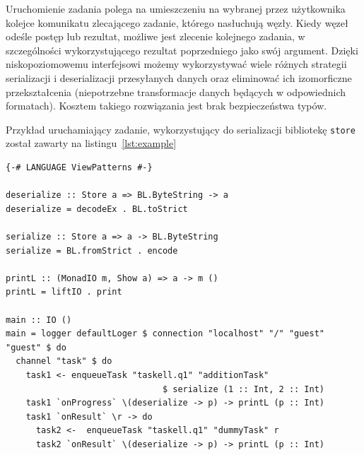Uruchomienie zadania polega na umieszczeniu na wybranej przez użytkownika kolejce komunikatu zlecającego zadanie, którego nasłuchują węzły. Kiedy węzeł odeśle postęp lub rezultat, możliwe jest zlecenie kolejnego zadania, w szczególności wykorzystującego rezultat poprzedniego jako swój argument. Dzięki niskopoziomowemu interfejsowi możemy wykorzystywać wiele różnych strategii serializacji i deserializacji przesyłanych danych oraz eliminować ich izomorficzne przekształcenia (niepotrzebne transformacje danych będących w odpowiednich formatach). Kosztem takiego rozwiązania jest brak bezpieczeństwa typów.

Przykład uruchamiający zadanie, wykorzystujący do serializacji bibliotekę \texttt{store} został zawarty na listingu~\ref{lst:example}
\newpage
\begin{lstlisting}[caption=Uruchamianie zadania, label=lst:example]
{-# LANGUAGE ViewPatterns #-}

deserialize :: Store a => BL.ByteString -> a
deserialize = decodeEx . BL.toStrict

serialize :: Store a => a -> BL.ByteString
serialize = BL.fromStrict . encode

printL :: (MonadIO m, Show a) => a -> m ()
printL = liftIO . print

main :: IO ()
main = logger defaultLoger $ connection "localhost" "/" "guest" "guest" $ do
  channel "task" $ do
    task1 <- enqueueTask "taskell.q1" "additionTask" 
                               $ serialize (1 :: Int, 2 :: Int)
    task1 `onProgress` \(deserialize -> p) -> printL (p :: Int)
    task1 `onResult` \r -> do
      task2 <-  enqueueTask "taskell.q1" "dummyTask" r
      task2 `onResult` \(deserialize -> p) -> printL (p :: Int)
\end{lstlisting}
